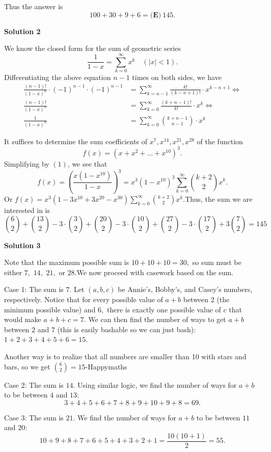 \begin{enumerate}
 Thus the answer is
 \[100+30+9+6=\boxed{\textbf{(E)}\ 145}.\]




\textbf{Solution 2}

We know the closed form for the sum of geometric series
 \[\frac{1}{1-x}=\sum_{k=0}^\infty x^k\quad (\lvert x\rvert < 1).\]Differentiating the above equation $n-1$ times on both sides, we have\begin{align*}\frac{(n-1)!}{(1-x)^n}\cdot(-1)^{n-1}\cdot(-1)^{n-1}&=\sum_{k=n-1}^\infty\frac{k!}{(k-n+1)!}\cdot x^{k-n+1}\iff\\\frac{(n-1)!}{(1-x)^n}&=\sum_{k=0}^\infty\frac{(k+n-1)!}{k!}\cdot x^k\iff\\\frac{1}{(1-x)^n}&=\sum_{k=0}^\infty\binom{k+n-1}{n-1}\cdot x^k\tag{1}\end{align*}


 It suffices to determine the sum coefficients of $x^7, x^{14}, x^{21}, x^{28}$ of the function
 \[f(x)=(x+x^2+\ldots+x^{10})^3.\]Simplifying by $(1)$, we see that
 \[f(x)=\left(\frac{x(1-x^{10})}{1-x}\right)^3=x^3(1-x^{10})^3\sum_{k=0}^\infty\binom{k+2}{2}x^k.\]Or $f(x)=x^3(1-3x^{10}+3x^{20}-x^{30})\sum_{k=0}^\infty\binom{k+2}{2}x^k$.Thus, the sum we are interested in is 
 \[\binom{6}{2}+\binom{13}{2}-3\cdot\binom{3}{2}+\binom{20}{2}-3\cdot\binom{10}{2}+\binom{27}{2}-3\cdot\binom{17}{2}+3\binom{7}{2}=\boxed{145}\]




\textbf{Solution 3}

Note that the maximum possible sum is $10+10+10=30,$ so sum must be either $7,$ $14,$ $21,$ or $28.$We now proceed with casework based on the sum.

 Case 1: The sum is $7.$ Let $(a,b,c)$ be Annie’s, Bobby’s, and Casey’s numbers, respectively. Notice that for every possible value of $a+b$ between $2$ (the minimum possible value) and $6,$ there is exactly one possible value of $c$ that would make $a+b+c=7.$ We can then find the number of ways to get $a+b$ between $2$ and $7$ (this is easily bashable so we can just bash): $1+2+3+4+5+6=15.$

 Another way is to realize that all numbers are smaller than 10 with stars and bars, so we get $\binom{6}{2}=15$-Happymaths

 Case 2: The sum is $14.$ Using similar logic, we find the number of ways for $a+b$ to be between $4$ and $13:$ 
 \[3+4+5+6+7+8+9+10+9+8=69.\]

 Case 3: The sum is $21.$ We find the number of ways for $a+b$ to be between $11$ and $20:$ 
 \[10+9+8+7+6+5+4+3+2+1=\frac{10(10+1)}{2}=55.\]


\end{enumerate}
